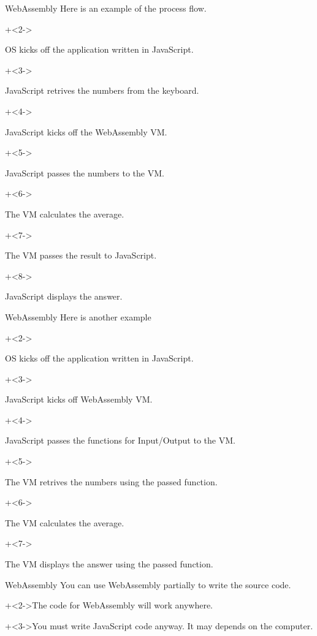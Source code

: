 \begin{frame}{WebAssembly}{}
    Here is an example of the process flow.
    \vspace{2ex}

    \begin{enumerate}
        \onslide+<2->{\item OS kicks off the application written in JavaScript.}
        \onslide+<3->{\item JavaScript retrives the numbers from the keyboard.}
        \onslide+<4->{\item JavaScript kicks off the WebAssembly VM.}
        \onslide+<5->{\item JavaScript passes the numbers to the VM.}
        \onslide+<6->{\item The VM calculates the average.}
        \onslide+<7->{\item The VM passes the result to JavaScript.}
        \onslide+<8->{\item JavaScript displays the answer.}
    \end{enumerate}
\end{frame}


\begin{frame}{WebAssembly}{}
    Here is another example
    \vspace{2ex}

    \begin{enumerate}
        \onslide+<2->{\item OS kicks off the application written in JavaScript.}
        \onslide+<3->{\item JavaScript kicks off WebAssembly VM.}
        \onslide+<4->{\item JavaScript passes the functions for Input/Output to the VM.}
        \onslide+<5->{\item The VM retrives the numbers using the passed function.}
        \onslide+<6->{\item The VM calculates the average.}
        \onslide+<7->{\item The VM displays the answer using the passed function.}
    \end{enumerate}
\end{frame}


\begin{frame}{WebAssembly}{}
    You can use WebAssembly partially to write the source code.
    \vspace{4ex}

    \onslide+<2->{The code for WebAssembly will work anywhere.}
    \vspace{4ex}

    \onslide+<3->{You must write JavaScript code anyway. It may depends on the computer.}
\end{frame}


